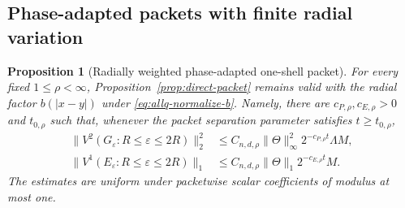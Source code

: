 \documentclass[11pt]{article}
\numberwithin{equation}{section}
\newtheorem{proposition}[theorem]{Proposition}
\theoremstyle{remark}
\theoremstyle{definition}
\begin{document}
\subsection{Phase-adapted packets with finite radial variation}

\begin{proposition}[Radially weighted phase-adapted one-shell packet]
\label{prop:allq-direct-packet}
For every fixed $1\le\rho<\infty$,
Proposition~\ref{prop:direct-packet} remains valid with the radial factor
$b(|x-y|)$ under \eqref{eq:allq-normalize-b}. Namely, there are
$c_{P,\rho},c_{E,\rho}>0$ and $t_{0,\rho}$ such that, whenever the
packet separation parameter satisfies $t\ge t_{0,\rho}$,
\begin{align}
 \|V^2(G_\varepsilon:R\le\varepsilon\le2R)\|_2^2
 &\le C_{n,d,\rho}\|\Theta\|_\infty^2
 2^{-c_{P,\rho}t}\Lambda M,
 \label{eq:allq-direct-G}\\
 \|V^1(E_\varepsilon:R\le\varepsilon\le2R)\|_1
 &\le C_{n,d,\rho}\|\Theta\|_1
 2^{-c_{E,\rho}t}M.
 \label{eq:allq-direct-E}
\end{align}
The estimates are uniform under packetwise scalar coefficients of modulus
at most one.
\end{proposition}
\end{document}
